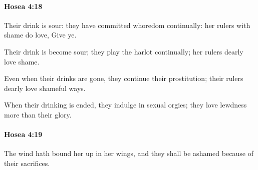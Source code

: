 		\paragraph{Hosea 4:18} %
			\label{HOSEA-4-18}

			Their drink is sour: they have committed whoredom continually: her rulers with shame do love, Give ye.

			\begin{versebox}
					\item[BHS] 
					\item[LXX] 
					\item[ASV] Their drink is become sour; they play the harlot continually; her rulers dearly love shame.
					\item[NIV] Even when their drinks are gone, they continue their prostitution; their rulers dearly love shameful ways.
					\item[NRSV] When their drinking is ended, they indulge in sexual orgies; they love lewdness more than their glory.
			\end{versebox}

		\paragraph{Hosea 4:19} %
			\label{HOSEA-4-19}

			The wind hath bound her up in her wings, and they shall be ashamed because of their sacrifices.

